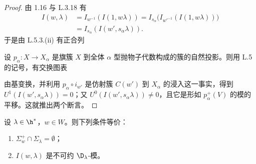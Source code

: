 \begin{proof}
由 1.16 与 L.3.18 有
\begin{align*}
I(w,\lambda)&=I_{w^{-1}}(I(1,w\lambda))=I_{s_\alpha}\bigl(I_{w'^{-1}}(I(1,w\lambda))\bigr)\\
&=I_{s_\alpha}(I(w',s_\alpha\lambda)).
\end{align*}
于是由 L.5.3.(ii) 有正合列
\begin{center}
{\small
{}
}
\end{center}
设 $p_\alpha:X\to X_\alpha$ 是旗簇 $X$ 到全体 $\alpha$ 型抛物子代数构成的簇的自然投影。则用 L.5 的记号，有交换图表
\begin{center}
\end{center}
由基变换，并利用 $p_\alpha\circ i_{w'}$ 是仿射簇 $C(w')$ 到 $X_\alpha$ 的浸入这一事实，得到 $U^1(I(w',s_\alpha\lambda))=0$；又 $U^0(I(w',s_\alpha\lambda))\neq0$，且它是形如 $p_\alpha^+(V)$ 的模的平移。这就推出两个断言。
\end{proof}

\begin{theorem}\label{thm:05.1.23}
设 $\lambda\in\h^*$，$w\in W$。则下列条件等价：
\begin{enumerate}[label=(\roman*)]
\item $\Sigma_w^+\cap\Sigma_\lambda=\emptyset$；
\item $I(w,\lambda)$ 是不可约 $\D_\lambda$-模。
\end{enumerate}
\end{theorem}

